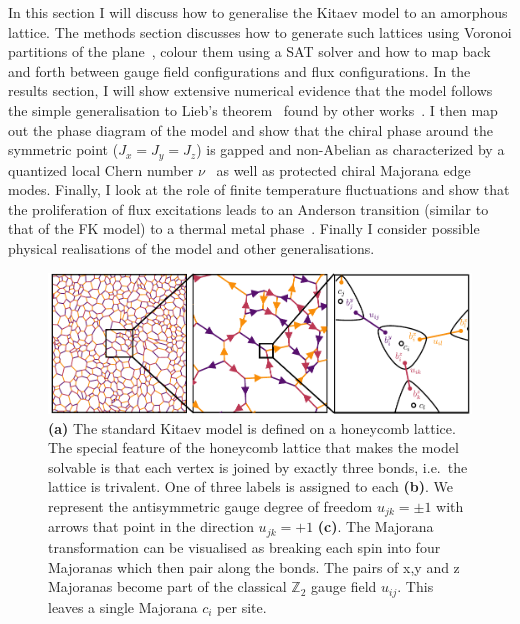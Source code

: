 In this section I will discuss how to generalise the Kitaev model to an amorphous lattice. The methods section discusses how to generate such lattices using Voronoi partitions of the plane~\autocite{mitchellAmorphousTopologicalInsulators2018,marsalTopologicalWeaireThorpeModels2020}, colour them using a SAT solver and how to map back and forth between gauge field configurations and flux configurations. In the results section, I will show extensive numerical evidence that the model follows the simple generalisation to Lieb's theorem~\autocite{lieb_flux_1994} found by other works~\autocite{eschmannThermodynamicClassificationThreedimensional2020,Yao2009,eschmann2019thermodynamics,Peri2020}. I then map out the phase diagram of the model and show that the chiral phase around the symmetric point (\(J_x = J_y = J_z\)) is gapped and non-Abelian as characterized by a quantized local Chern number \(\nu\)~\autocite{peru_preprint,mitchellAmorphousTopologicalInsulators2018} as well as protected chiral Majorana edge modes. Finally, I look at the role of finite temperature fluctuations and show that the proliferation of flux excitations leads to an Anderson transition (similar to that of the FK model) to a thermal metal phase~\autocite{Laumann2012,lahtinenTopologicalLiquidNucleation2012,selfThermallyInducedMetallic2019}. Finally I consider possible physical realisations of the model and other generalisations.

\hypertarget{fig:amk-zoom}{%
\begin{figure}
\centering
\includegraphics[width=1\textwidth,height=\textheight]{figure_code/amk_chapter/intro/amk_zoom/amk_zoom_by_hand}
\caption[{The Kitaev Honeycomb Model}]{\textbf{(a)} The standard Kitaev model is defined on a honeycomb lattice. The special feature of the honeycomb lattice that makes the model solvable is that each vertex is joined by exactly three bonds, i.e.~the lattice is trivalent. One of three labels is assigned to each \textbf{(b)}. We represent the antisymmetric gauge degree of freedom \(u_{jk} = \pm 1\) with arrows that point in the direction \(u_{jk} = +1\) \textbf{(c)}. The Majorana transformation can be visualised as breaking each spin into four Majoranas which then pair along the bonds. The pairs of x,y and z Majoranas become part of the classical \(\mathbb{Z}_2\) gauge field \(u_{ij}\). This leaves a single Majorana \(c_i\) per site.}
\label{fig:amk-zoom}
\end{figure}
}

